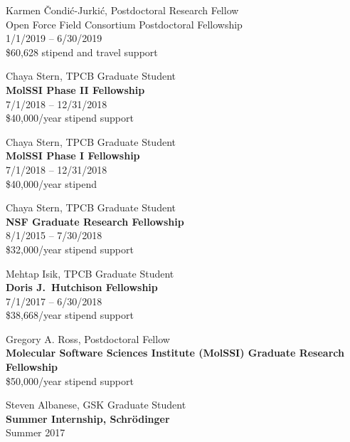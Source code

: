 \documentclass[10pt]{article}
\begin{document}
\vspace{1.5ex}

Karmen \v{C}ondi\'{c}-Jurki\'{c}, Postdoctoral Research Fellow\\
{Open Force Field Consortium Postdoctoral Fellowship}\\
1/1/2019 -- 6/30/2019\\
\$60,628 stipend and travel support

\vspace{1.5ex}

Chaya Stern, TPCB Graduate Student\\
{\bf MolSSI Phase II Fellowship}\\
7/1/2018 -- 12/31/2018\\
\$40,000/year stipend support

\vspace{1.5ex}

Chaya Stern, TPCB Graduate Student\\
{\bf MolSSI Phase I Fellowship}\\
7/1/2018 -- 12/31/2018\\
\$40,000/year stipend

\vspace{1.5ex}	

Chaya Stern, TPCB Graduate Student\\
{\bf NSF Graduate Research Fellowship}\\
8/1/2015 -- 7/30/2018\\
\$32,000/year stipend support

\vspace{1.5ex}

Mehtap Isik, TPCB Graduate Student\\
{\bf Doris J.~Hutchison Fellowship}\\
7/1/2017 -- 6/30/2018\\
\$38,668/year stipend support

\vspace{1.5ex}

Gregory A. Ross, Postdoctoral Fellow\\
{\bf Molecular Software Sciences Institute (MolSSI) Graduate Research Fellowship}\\
\$50,000/year stipend support

\vspace{1.5ex}

Steven Albanese, GSK Graduate Student\\
{\bf Summer Internship, Schr\"{o}dinger}\\
Summer 2017
\end{document}
